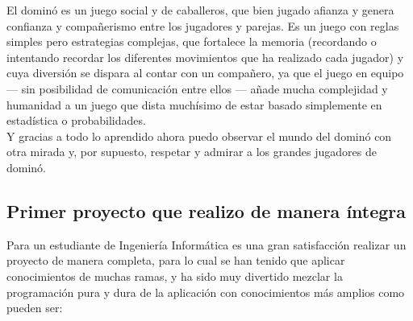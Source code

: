 
El dominó es un juego social y de caballeros, que bien jugado afianza y genera confianza y compañerismo entre los jugadores
y parejas. Es un juego con reglas simples pero estrategias complejas, que fortalece la memoria (recordando o intentando
recordar los diferentes movimientos que ha realizado cada jugador) y cuya diversión se dispara al contar con un compañero,
ya que el juego en equipo --- sin posibilidad de comunicación entre ellos --- añade mucha complejidad y humanidad a un
juego que dista muchísimo de estar basado simplemente en estadística o probabilidades. \\

Y gracias a todo lo aprendido ahora puedo observar el mundo del dominó con otra mirada y, por supuesto, respetar y admirar
a los grandes jugadores de dominó.

\subsection{Primer proyecto que realizo de manera íntegra}


Para un estudiante de Ingeniería Informática es una gran satisfacción realizar un proyecto de manera completa, para lo cual
se han tenido que aplicar conocimientos de muchas ramas, y ha sido muy divertido mezclar la programación pura y dura
de la aplicación con conocimientos más amplios como pueden ser:

